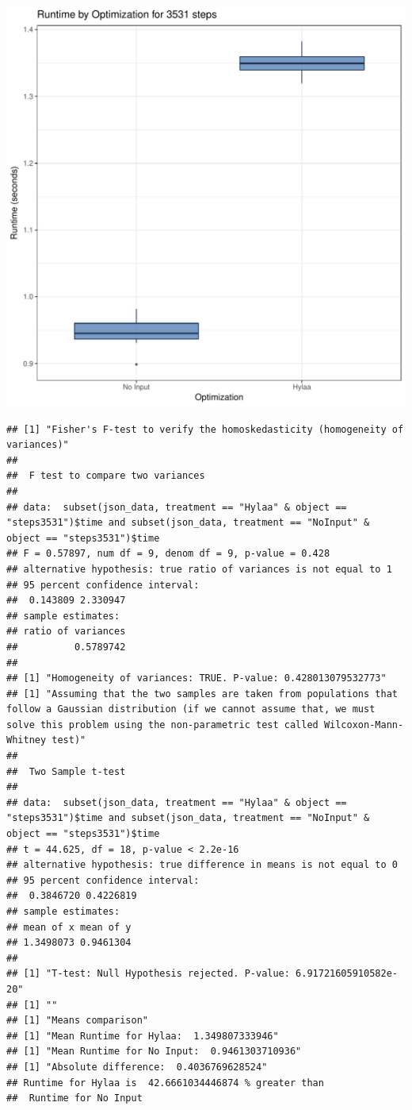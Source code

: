 \documentclass{article}\usepackage[]{graphicx}\usepackage[]{color}
\makeatletter
\def\maxwidth{ %
  \ifdim\Gin@nat@width>\linewidth
    \linewidth
  \else
    \Gin@nat@width
  \fi
}
\newenvironment{kframe}{%
 \def\at@end@of@kframe{}%
 \ifinner\ifhmode%
  \def\at@end@of@kframe{\end{minipage}}%
  \begin{minipage}{\columnwidth}%
 \fi\fi%
 \def\FrameCommand##1{\hskip\@totalleftmargin \hskip-\fboxsep
 \colorbox{shadecolor}{##1}\hskip-\fboxsep
     \hskip-\linewidth \hskip-\@totalleftmargin \hskip\columnwidth}%
 \MakeFramed {\advance\hsize-\width
   \@totalleftmargin\z@ \linewidth\hsize
   \@setminipage}}%
 {\par\unskip\endMakeFramed%
 \at@end@of@kframe}
\newenvironment{knitrout}{}{} %
\makeatother
\begin{document}
\begin{knitrout}
\color{fgcolor}
\includegraphics[width=\maxwidth]{figure/RH4_steps3531-1} 
\begin{kframe}\begin{verbatim}
## [1] "Fisher's F-test to verify the homoskedasticity (homogeneity of variances)"
## 
## 	F test to compare two variances
## 
## data:  subset(json_data, treatment == "Hylaa" & object == "steps3531")$time and subset(json_data, treatment == "NoInput" & object == "steps3531")$time
## F = 0.57897, num df = 9, denom df = 9, p-value = 0.428
## alternative hypothesis: true ratio of variances is not equal to 1
## 95 percent confidence interval:
##  0.143809 2.330947
## sample estimates:
## ratio of variances 
##          0.5789742 
## 
## [1] "Homogeneity of variances: TRUE. P-value: 0.428013079532773"
## [1] "Assuming that the two samples are taken from populations that follow a Gaussian distribution (if we cannot assume that, we must solve this problem using the non-parametric test called Wilcoxon-Mann-Whitney test)"
## 
## 	Two Sample t-test
## 
## data:  subset(json_data, treatment == "Hylaa" & object == "steps3531")$time and subset(json_data, treatment == "NoInput" & object == "steps3531")$time
## t = 44.625, df = 18, p-value < 2.2e-16
## alternative hypothesis: true difference in means is not equal to 0
## 95 percent confidence interval:
##  0.3846720 0.4226819
## sample estimates:
## mean of x mean of y 
## 1.3498073 0.9461304 
## 
## [1] "T-test: Null Hypothesis rejected. P-value: 6.91721605910582e-20"
## [1] ""
## [1] "Means comparison"
## [1] "Mean Runtime for Hylaa:  1.349807333946"
## [1] "Mean Runtime for No Input:  0.9461303710936"
## [1] "Absolute difference:  0.4036769628524"
## Runtime for Hylaa is  42.6661034446874 % greater than 
##  Runtime for No Input
\end{verbatim}
\end{kframe}
\end{knitrout}
\end{document}
